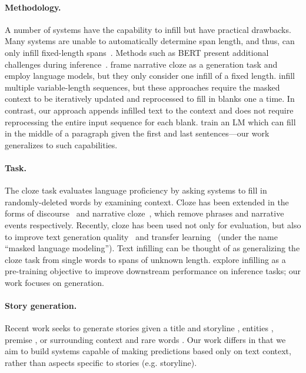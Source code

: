 \paragraph{Methodology.}
A number of systems have the capability to infill but have practical drawbacks. 
Many systems are unable to automatically determine span length, and thus, can only infill fixed-length spans~\citep{fedus2018maskgan,devlin2019bert,yang2019xlnet,joshi2019spanbert,gu2019insertion,liu2019tigs}.
Methods such as BERT present additional challenges during inference~\citep{wang2019bert}.
\citet{rudinger2015script} frame narrative cloze as a generation task and employ language models, 
but they only consider one infill of a fixed length. 
\citet{zhu2019text,shen2020blank} infill multiple variable-length sequences, 
but these approaches require the masked context to be iteratively updated and reprocessed to fill in blanks one a time. 
In contrast, our approach appends infilled text to the context and does not require reprocessing the entire input sequence for each blank. 
\citet{ai2019haim} train an LM which can fill in the middle of a paragraph given the first and last sentences---our work generalizes to such capabilities.


\paragraph{Task.} The cloze task \citep{taylor1953cloze} evaluates language proficiency by asking systems to fill in randomly-deleted words by examining context. 
Cloze has been extended in the forms of discourse~\citep{deyes1984towards} and narrative cloze~\citep{chambers2008narrative}, 
which remove phrases and narrative events respectively.
Recently, 
cloze has been used not only for evaluation, but also to improve text generation quality~\citep{fedus2018maskgan}
and transfer learning~\citep{devlin2019bert} (under the name ``masked language modeling'').
Text infilling can be thought of as generalizing the cloze task from single words to spans of unknown length.
\citet{raffel2019exploring} explore infilling as a pre-training objective to improve downstream performance on inference tasks;
our work focuses on generation.

\paragraph{Story generation.}

Recent work seeks to generate stories given a title and storyline \citep{peng2019plan}, 
entities \citep{clark2018neural}, 
premise \citep{fan2018hierarchical}, 
or surrounding context and rare words \citep{ippolito2019unsupervised}. 
Our work differs in that we aim to build systems capable of making predictions based only on text context, 
rather than aspects specific to stories (e.g. storyline).
